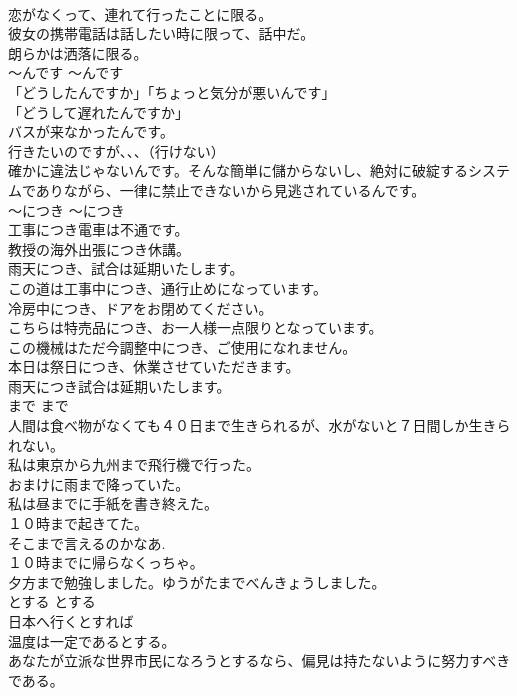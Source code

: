 \documentclass[8pt]{extreport}
\begin{document}
\begin{CJK}{UTF8}{min}
\\	恋がなくって、連れて行ったことに限る。  
\\	彼女の携帯電話は話したい時に限って、話中だ。  
\\	朗らかは洒落に限る。  
\\	〜んです	〜んです	
\\	「どうしたんですか」「ちょっと気分が悪いんです」  
\\	「どうして遅れたんですか」
\\	バスが来なかったんです。 
\\	行きたいのですが、、、（行けない）  
\\	確かに違法じゃないんです。そんな簡単に儲からないし、絶対に破綻するシステムでありながら、一律に禁止できないから見逃されているんです。  
\\	〜につき	〜につき	
\\	工事につき電車は不通です。  
\\	教授の海外出張につき休講。  
\\	雨天につき、試合は延期いたします。  
\\	この道は工事中につき、通行止めになっています。  
\\	冷房中につき、ドアをお閉めてください。  
\\	こちらは特売品につき、お一人様一点限りとなっています。  
\\	この機械はただ今調整中につき、ご使用になれません。   
\\	本日は祭日につき、休業させていただきます。  
\\	雨天につき試合は延期いたします。   
\\	まで	まで	
\\	人間は食べ物がなくても４０日まで生きられるが、水がないと７日間しか生きられない。  
\\	私は東京から九州まで飛行機で行った。  
\\	おまけに雨まで降っていた。  
\\	私は昼までに手紙を書き終えた。  
\\	１０時まで起きてた。  
\\	そこまで言えるのかなあ.  
\\	１０時までに帰らなくっちゃ。  
\\	夕方まで勉強しました。ゆうがたまでべんきょうしました。  
\\	とする	とする	
\\	日本へ行くとすれば  
\\	温度は一定であるとする。  
\\	あなたが立派な世界市民になろうとするなら、偏見は持たないように努力すべきである。  

\end{CJK}
\end{document}
